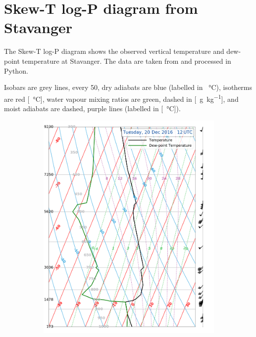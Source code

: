 \section{Skew-T log-P diagram from Stavanger}%
\label{app:sounding}
The Skew-T log-P diagram shows the observed vertical temperature and dew-point temperature at Stavanger. The data are taken from \cite{wyoming_atmospheric_2018} and processed in Python.

Isobars are grey lines, every \SI{50}{\hPa}, dry adiabats are blue (labelled in \SI{}{\celsius}), isotherms are red [\SI{}{\celsius}], water vapour mixing ratios are green, dashed in [\SI{}{\gram\per\kilogram}], and moist adiabats are dashed, purple lines (labelled in [\SI{}{\celsius}]).

\begin{landscape}
	\begin{figure}%
		\centering
		\begin{subfigure}[b]{0.66\textheight}
			\includegraphics[trim={0cm 0.2cm 2.5cm .5cm},clip,width=\textwidth]{./fig_Sounding/20161220_12Z}

\end{subfigure}
\end{figure}
\end{landscape}
